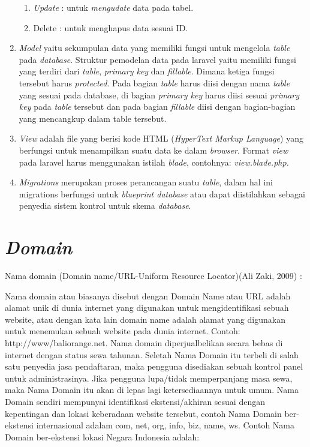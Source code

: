 \begin{enumerate}
\begin{enumerate}
\item \textit{Update} \kern 0pc : untuk \textit{mengudate} data pada tabel.

\item Delete \kern 0.3pc : untuk menghapus data sesuai ID.
\end{enumerate}

\item \textit{Model} yaitu sekumpulan data yang memiliki fungsi untuk mengelola \textit{table} pada \textit{database}. Struktur pemodelan data pada laravel yaitu memiliki fungsi yang terdiri dari \textit{table}, \textit{primary key} dan \textit{fillable}. Dimana ketiga fungsi tersebut harus \textit{protected}. Pada bagian \textit{table} harus diisi dengan nama \textit{table} yang sesuai pada database, di bagian \textit{primary key} harus diisi sesuai \textit{primary key} pada \textit{table} tersebut dan pada bagian \textit{fillable} diisi dengan bagian-bagian yang mencangkup dalam table tersebut.

\item \textit{View} adalah file yang berisi kode HTML (\textit{HyperText Markup Language}) yang berfungsi untuk menampilkan suatu data ke dalam \textit{browser}. Format \textit{view} pada laravel harus menggunakan istilah \textit{blade}, contohnya: \textit{view.blade.php.
}
\item \textit{Migrations} merupakan proses perancangan suatu \textit{table}, dalam hal ini migrations berfungsi untuk \textit{blueprint database} atau dapat diistilahkan sebagai penyedia sistem kontrol untuk skema \textit{database}. 

\end{enumerate}

\section{\textit{Domain}}

Nama domain (Domain name/URL-Uniform Resource Locator)(Ali Zaki, 2009) \cite{7} :

Nama domain atau biasanya disebut dengan Domain Name atau URL adalah alamat unik di dunia internet yang digunakan untuk mengidentifikasi sebuah website, atau dengan kata lain domain name adalah alamat yang digunakan untuk menemukan sebuah website pada dunia internet. Contoh: http://www/baliorange.net. Nama domain diperjualbelikan secara bebas di internet dengan status sewa tahunan. Seletah Nama Domain itu terbeli di salah satu penyedia jasa pendaftaran, maka pengguna disediakan sebuah kontrol panel untuk administrasinya. Jika pengguna lupa/tidak memperpanjang masa sewa, maka Nama Domain itu akan di lepas lagi ketersediaannya untuk umum. Nama Domain sendiri mempunyai identifikasi ekstensi/akhiran sesuai dengan kepentingan dan lokasi keberadaan website tersebut, contoh Nama Domain ber-ekstensi internasional adalam com, net, org, info, biz, name, ws. Contoh Nama Domain ber-ekstensi lokasi Negara Indonesia adalah:

